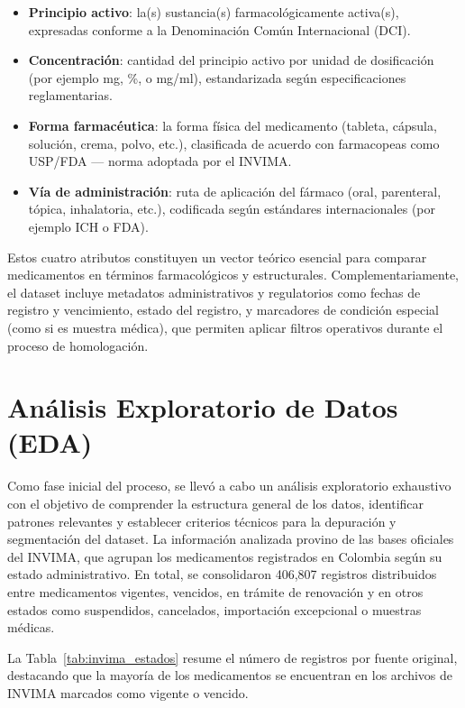 \documentclass[conference]{IEEEtran}
\begin{document}
\begin{itemize}
    \item \textbf{Principio activo}: la(s) sustancia(s) farmacológicamente activa(s), expresadas conforme a la Denominación Común Internacional (DCI).
    \item \textbf{Concentración}: cantidad del principio activo por unidad de dosificación (por ejemplo mg, \%, o mg/ml), estandarizada según especificaciones reglamentarias.
    \item \textbf{Forma farmacéutica}: la forma física del medicamento (tableta, cápsula, solución, crema, polvo, etc.), clasificada de acuerdo con farmacopeas como USP/FDA — norma adoptada por el INVIMA.
    \item \textbf{Vía de administración}: ruta de aplicación del fármaco (oral, parenteral, tópica, inhalatoria, etc.), codificada según estándares internacionales (por ejemplo ICH o FDA).
\end{itemize}

Estos cuatro atributos constituyen un vector teórico esencial para comparar medicamentos en términos farmacológicos y estructurales. Complementariamente, el dataset incluye metadatos administrativos y regulatorios como fechas de registro y vencimiento, estado del registro, y marcadores de condición especial (como si es muestra médica), que permiten aplicar filtros operativos durante el proceso de homologación.

\section{Análisis Exploratorio de Datos (EDA)}
Como fase inicial del proceso, se llevó a cabo un análisis exploratorio exhaustivo con el objetivo de comprender la estructura general de los datos, identificar patrones relevantes y establecer criterios técnicos para la depuración y segmentación del dataset. La información analizada provino de las bases oficiales del INVIMA, que agrupan los medicamentos registrados en Colombia según su estado administrativo. En total, se consolidaron 406,807 registros distribuidos entre medicamentos vigentes, vencidos, en trámite de renovación y en otros estados como suspendidos, cancelados, importación excepcional o muestras médicas. 

La Tabla~\ref{tab:invima_estados} resume el número de registros por fuente original, destacando que la mayoría de los medicamentos se encuentran en los archivos de INVIMA marcados como vigente o vencido.
\end{document}
